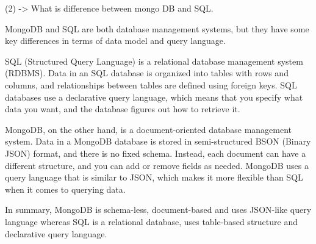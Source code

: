 (2) -> What is difference between mongo DB and SQL.

 MongoDB and SQL are both database management systems, but they have some key differences in terms of data model and query language.

SQL (Structured Query Language) is a relational database management system (RDBMS). 
Data in an SQL database is organized into tables with rows and columns,
 and relationships between tables are defined using foreign keys.
 SQL databases use a declarative query language, which means that you specify what data you want, and the database figures out how to retrieve it.


MongoDB, on the other hand, is a document-oriented database management system.
 Data in a MongoDB database is stored in semi-structured BSON (Binary JSON) format,
  and there is no fixed schema. Instead, each document can have a different structure,
   and you can add or remove fields as needed. MongoDB uses a query language that is similar to JSON, 
   which makes it more flexible than SQL when it comes to querying data.

In summary, MongoDB is schema-less, document-based and uses JSON-like query language whereas SQL is a relational database, 
uses table-based structure and declarative query language.